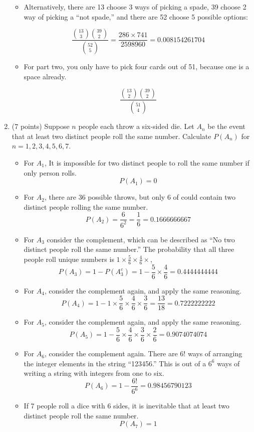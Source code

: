 \documentclass[11pt]{article}
\begin{document}
\begin{enumerate}
\begin{itemize}
\item Alternatively, there are 13 choose 3 ways of picking a spade, 39 choose 2 way of picking a ``not spade,'' and there are 52 choose 5 possible options:

\begin{equation*}
\frac{{13 \choose 3} {39 \choose 2}}{{52 \choose 5}} = \frac{{286} \times {741}}{{2598960}} = 0.008154261704
\end{equation*}

\item For part two, you only have to pick four cards out of 51, because one is a space already.

\begin{equation*}
\frac{{13 \choose 2} {39 \choose 2}}{{51 \choose 4}} 
\end{equation*}

\end{itemize}

\clearpage

\item (7 points) Suppose $n$ people each throw a six-sided die.  Let $A_n$ be
the event that at least two distinct people roll the same number.  Calculate
$P(A_n)$ for $n=1,2,3,4,5,6,7$.

\begin{itemize}

\item For $A_1$, It is impossible for two distinct people to roll the same number if only person rolls.
\[P(A_1) = 0\]
\item For $A_2$, there are 36 possible throws, but only 6 of could contain two distinct people rolling the same number.
\[P(A_2) = \frac{6}{6^2} = \frac{1}{6} = 0.1666666667\]
\item For $A_3$ consider the complement, which can be described as ``No two distinct people roll the same number.'' 
The probability that all three people roll unique numbers is $1 \times \frac{5}{6} \times \frac{4}{6} \times$, 
\[P(A_3) = 1 - P(A_3^c) = 1 - \frac{5}{6} \times \frac{4}{6} = 0.4444444444\]
\item For $A_4$, consider the complement again, and apply the same reasoning.
\[P(A_4) = 1 - 1 \times \frac{5}{6} \times \frac{4}{6} \times \frac{3}{6} = \frac{13}{18} =0.7222222222 \]
\item For $A_5$, consider the complement again, and apply the same reasoning.
\[P(A_5) = 1 - \frac{5}{6} \times \frac{4}{6} \times \frac{3}{6} \times \frac{2}{6} = 0.9074074074\]
\item For $A_6$, consider the complement again.
There are $6!$ ways of arranging the integer elements in the string ``123456.'' This is out of a $6^6$ ways of writing
a string with integers from one to six.
\[P(A_6) = 1 - \frac{6!}{6^6} = 0.98456790123\]
\item If 7 people roll a dice with 6 sides, it is inevitable that at least two distinct people roll the same number.
\[P(A_7) = 1\]


\end{itemize}
\end{enumerate}
\end{document}
